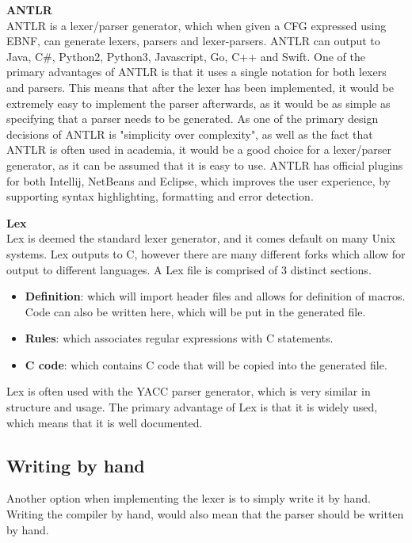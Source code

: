 \textbf{ANTLR}\\
ANTLR is a lexer/parser generator, which when given a CFG expressed using EBNF, can generate lexers, parsers and lexer-parsers\cite{ANTLR}.
ANTLR can output to Java, C\#, Python2, Python3, Javascript, Go, C++ and Swift\cite{ANTLRDocsTargets}.
One of the primary advantages of ANTLR is that it uses a single notation for both lexers and parsers\cite{ANTLRDocs}.
This means that after the lexer has been implemented, it would be extremely easy to implement the parser afterwards, as it would be as simple as specifying that a parser needs to be generated.
As one of the primary design decisions of ANTLR is "simplicity over complexity", as well as the fact that ANTLR is often used in academia, it would be a good choice for a lexer/parser generator, as it can be assumed that it is easy to use.
ANTLR has official plugins for both Intellij, NetBeans and Eclipse, which improves the user experience, by supporting syntax highlighting, formatting and error detection.

\textbf{Lex}\\
Lex is deemed the standard lexer generator, and it comes default on many Unix systems.
Lex outputs to C, however there are many different forks which allow for output to different languages.
A Lex file is comprised of 3 distinct sections\cite{Lex}.
\begin{itemize}
	\item \textbf{Definition}: which will import header files and allows for definition of macros. 
	Code can also be written here, which will be put in the generated file.
	\item \textbf{Rules}: which associates regular expressions with C statements.
	\item \textbf{C code}: which contains C code that will be copied into the generated file.
\end{itemize}
Lex is often used with the YACC parser generator, which is very similar in structure and usage.
The primary advantage of Lex is that it is widely used, which means that it is well documented.

\subsection{Writing by hand}
Another option when implementing the lexer is to simply write it by hand.
Writing the compiler by hand, would also mean that the parser should be written by hand.

